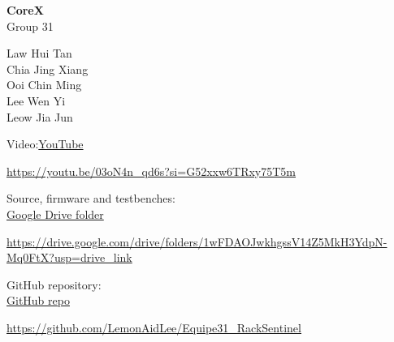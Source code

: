 \noindent{\color{navy}\rule{\linewidth}{0.8pt}}\par\vspace{4mm}
\noindent\begin{minipage}[t]{0.20\linewidth}
  {\sffamily\fontsize{16}{19}\selectfont\bfseries\color{navy}CoreX}\\[1pt]
  {\sffamily\small\color{slate}Group 31}
\end{minipage}\hfill
\begin{minipage}[t]{0.34\linewidth}
  {\sffamily\small\color{ink}Law Hui Tan\\ Chia Jing Xiang\\ Ooi Chin Ming\\ Lee Wen Yi\\ Leow Jia Jun}
\end{minipage}\hfill
\begin{minipage}[t]{0.44\linewidth}
  {\sffamily\small\color{ink}Video:\enspace\href{https://youtu.be/03oN4n_qd6s?si=G52xxw6TRxy75T5m}{\color{river}YouTube}\\[1pt]
   {\fontsize{5.6}{6.6}\selectfont\ttfamily\color{slate}\RaggedRight
    \url{https://youtu.be/03oN4n_qd6s?si=G52xxw6TRxy75T5m}\par}\vspace{2pt}
   Source, firmware and testbenches:\\
   \href{https://drive.google.com/drive/folders/1wFDAOJwkhgssV14Z5MkH3YdpN-Mq0FtX?usp=drive_link}{\color{river}Google Drive folder}\\[1pt]
   {\fontsize{5.6}{6.6}\selectfont\ttfamily\color{slate}\RaggedRight
    \url{https://drive.google.com/drive/folders/1wFDAOJwkhgssV14Z5MkH3YdpN-Mq0FtX?usp=drive_link}\par}\vspace{2pt}
   GitHub repository:\\
   \href{https://github.com/LemonAidLee/Equipe31_RackSentinel}{\color{river}GitHub repo}\\[1pt]
   {\fontsize{5.6}{6.6}\selectfont\ttfamily\color{slate}\RaggedRight
    \url{https://github.com/LemonAidLee/Equipe31_RackSentinel}\par}}
\end{minipage}\par
\endgroup
\clearpage
